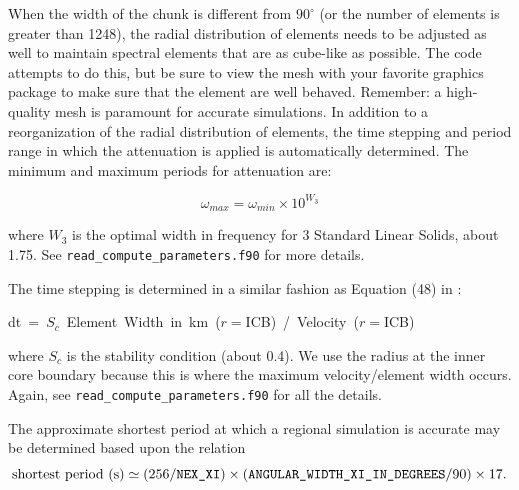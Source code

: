 When the width of the chunk is different from $90^{\circ}$ (or the
number of elements is greater than 1248), the radial distribution
of elements needs to be adjusted as well to maintain spectral elements
that are as cube-like as possible. The code attempts to do this, but
be sure to view the mesh with your favorite graphics package to make
sure that the element are well behaved.
Remember: a high-quality mesh is paramount for accurate simulations.
In addition to a reorganization of the radial distribution of elements,
the time stepping and period range in which the attenuation is applied
is automatically determined. The minimum and maximum periods for attenuation
are:

\[
\omega_{max}=\omega_{min}\times10^{W_{3}}\]


\noindent where $W_{3}$ is the optimal width in frequency for 3 Standard
Linear Solids, about 1.75. See \texttt{\small read\_compute\_parameters.f90}
for more details.

The time stepping is determined in a similar fashion as Equation (48)
in \citet{KoTr02a}:

\begin{lyxcode}
dt~=~$S_{c}$~Element~Width~in~km~($r=$ICB)~/~Velocity~($r=$ICB)
\end{lyxcode}
where $S_{c}$ is the stability condition (about 0.4). We use the
radius at the inner core boundary because this is where the maximum
velocity/element width occurs. Again, see \texttt{\small read\_compute\_parameters}\texttt{.f90}
for all the details.

The approximate shortest period at which a regional simulation is
accurate may be determined based upon the relation
\begin{equation}
\mbox{shortest period (s)}\simeq(256/\mbox{\texttt{NEX\_XI}})\times(\texttt{ANGULAR\_WIDTH\_XI\_IN\_DEGREES}/90)\times17.\label{eq:shortest_period_regional}\end{equation}



